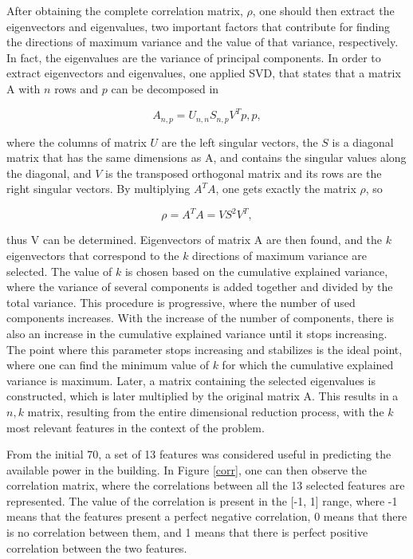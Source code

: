 After obtaining the complete correlation matrix, $\rho$, one should then extract the eigenvectors and eigenvalues, two important factors that contribute for finding the directions of maximum variance and the value of that variance, respectively. In fact, the eigenvalues are the variance of principal components. In order to extract eigenvectors and eigenvalues, one applied \ac{SVD}, that states that a matrix A with $n$ rows and $p$ can be decomposed in 

\begin{equation}
   A_{n,p} = U_{n,n} S_{n,p} V^T{p,p},
   \label{PCA3}
\end{equation}

where the columns of matrix $U$ are the left singular vectors, the $S$ is a diagonal matrix that has the same dimensions as A, and contains the singular values along the diagonal, and $V$ is the transposed orthogonal matrix and its rows are the right singular vectors. By multiplying $A^TA$, one gets exactly the matrix $\rho$, so 

\begin{equation}
   \rho = A^TA = VS^2V^T,
   \label{PCA4}
\end{equation}

thus V can be determined. Eigenvectors of matrix A are then found, and the $k$ eigenvectors that correspond to the $k$ directions of maximum variance are selected. The value of $k$ is chosen based on the cumulative explained variance, where the variance of several components is added together and divided by the total variance. This procedure is progressive, where the number of used components increases. With the increase of the number of components, there is also an increase in the cumulative explained variance until it stops increasing. The point where this parameter stops increasing and stabilizes is the ideal point, where one can find the minimum value of $k$ for which the cumulative explained variance is maximum. Later, a matrix containing the selected eigenvalues is constructed, which is later multiplied by the original matrix A. This results in a $n,k$ matrix, resulting from the entire dimensional reduction process, with the $k$ most relevant features in the context of the problem.

From the initial 70, a set of 13 features was considered useful in predicting the available power in the building. In Figure \ref{corr}, one can then observe the correlation matrix, where the correlations between all the 13 selected features are represented. The value of the correlation is present in the [-1, 1] range, where -1 means that the features present a perfect negative correlation, 0 means that there is no correlation between them, and 1 means that there is perfect positive correlation between the two features. 


